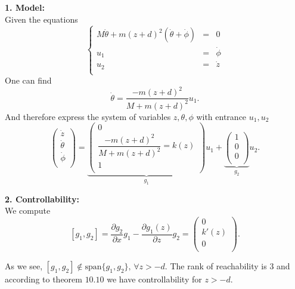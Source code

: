 \textbf{1. Model:}\\

Given the equations 
$$\left\{ \begin{array}{rrr}
M\dot{\theta}+ m(z+d)^{2}(\dot{\theta}+\dot{\phi}) & = & 0\\
u_{1} & = & \dot{\phi}\\
u_{2} & = & \dot{z}\\
\end{array}\right.$$
One can find $$\dot{\theta}=\dfrac{-m(z+d)^{2}}{M+m(z+d)^{2}}u_{1}.$$
And therefore express the system of variables $z, \theta, \phi$ with entrance $u_{1}, u_{2}$
$$\begin{pmatrix}
\dot{z}\\
\dot{\theta}\\
\dot{\phi}\\
\end{pmatrix}=
\underbrace{
\begin{pmatrix}
0\\
\dfrac{-m(z+d)^{2}}{M+m(z+d)^{2}}=k(z)\\
1\\
\end{pmatrix}}_{g_{1}}u_{1}+
\underbrace{
\begin{pmatrix}
1\\
0\\
0\\
\end{pmatrix}}_{g_{2}}u_{2}.$$

\textbf{2. Controllability:}\\

We compute
$$[g_{1},g_{2}]=\dfrac{\partial g_{2}}{\partial x}g_{1}-\dfrac{\partial g_{1}(z)}{\partial z}g_{2}=\begin{pmatrix}
0\\
k'(z)\\
0\\
\end{pmatrix}.$$

As we see, $[g_{1},g_{2}]\notin \text{span}\{g_{1},g_{2}\}\text{, } \forall z>-d$. The rank of reachability is $3$ and according to theorem $10.10$ we have controllability for $z>-d$.

